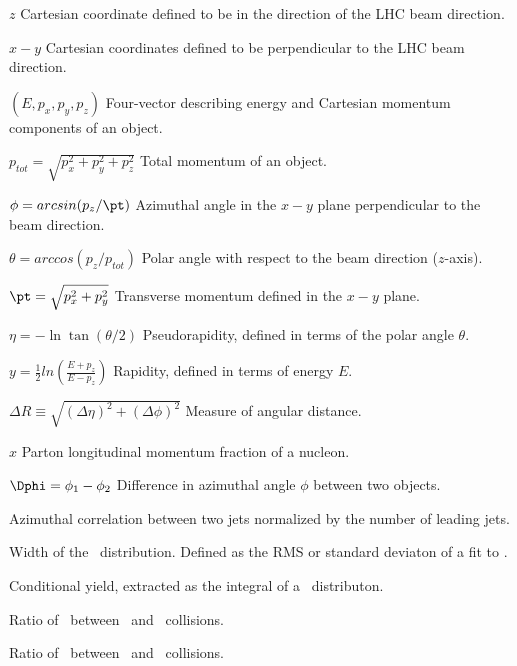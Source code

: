 \begin{symbollist*}
\item[$z$] Cartesian coordinate defined to be in the direction of the LHC beam direction.
\item[$x-y$] Cartesian coordinates defined to be perpendicular to the LHC beam direction.
\item[$(E, p_{x}, p_{y}, p_{z})$] Four-vector describing energy and Cartesian momentum components of an object.
\item[$p_{tot} = \sqrt{p_{x}^{2} + p_{y}^{2} + p_{z}^{2}}$] Total momentum of an object.
\item[$\phi=arcsin(p_{z}/\pt)$] Azimuthal angle in the $x-y$ plane perpendicular to the beam direction.
\item[$\theta = arccos(p_{z}/p_{tot})$] Polar angle with respect to the beam direction ($z$-axis).
\item[$\pt=\sqrt{p_{x}^{2}+p_{y}^{2}}$] Transverse momentum defined in the $x-y$ plane.
\item[$\eta=-\ln\tan(\theta/2)$] Pseudorapidity, defined in terms of the polar angle $\theta$.
\item[$y=\frac{1}{2}ln(\frac{E+p_{z}}{E-p_{z}})$] Rapidity, defined in terms of energy $E$.
\item[$\Delta R \equiv \sqrt{(\Delta\eta)^{2} + (\Delta\phi)^{2}}$] Measure of angular distance.
\item[$x$] Parton longitudinal momentum fraction of a nucleon.
\item[$\Dphi=\phi_{1}-\phi_{2}$] Difference in azimuthal angle $\phi$ between two objects.
\item[\conetwo] Azimuthal correlation between two jets normalized by the number of leading jets.
\item[\wonetwo] Width of the \conetwo\ distribution. Defined as the RMS or standard deviaton of a fit to \conetwo.
\item[\ionetwo] Conditional yield, extracted as the integral of a \conetwo\ distributon. \
\item[\cppb] Ratio of \wonetwo\ between \pp\ and \pPb\ collisions.
\item[\ippb] Ratio of \ionetwo\ between \pp\ and \pPb\ collisions.
\end{symbollist*}
